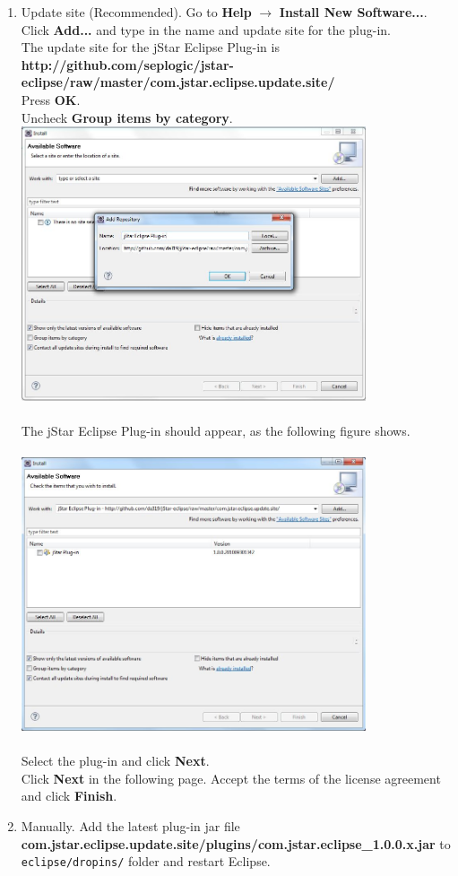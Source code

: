 \documentclass{article}
\begin{document}
\begin{enumerate}
\item Update site (Recommended). Go to {\bf  Help} $\rightarrow$ {\bf Install New Software...}. Click {\bf Add...}  and type in the name and update site for the plug-in. \\ The update site for the jStar Eclipse Plug-in is \\ {\bf http://github.com/seplogic/jstar-eclipse/raw/master/com.jstar.eclipse.update.site/}\\
Press {\bf OK}.\\
Uncheck {\bf Group items by category}.\\
\includegraphics[width=4in]{images/updateSite1.jpg}\\\\
The jStar Eclipse Plug-in should appear, as the following figure shows.\\\\
\includegraphics[width=4in]{images/updateSite2.jpg}\\\\
Select the plug-in and click {\bf Next}.\\
Click {\bf Next} in the following page.
Accept the terms of the license agreement and click {\bf Finish}.
\item Manually. Add the latest plug-in jar file\\ \textbf{com.jstar.eclipse.update.site/plugins/com.jstar.eclipse\_1.0.0.x.jar} to \texttt{eclipse/dropins/} folder and restart Eclipse.
\end{enumerate}
\end{document}
